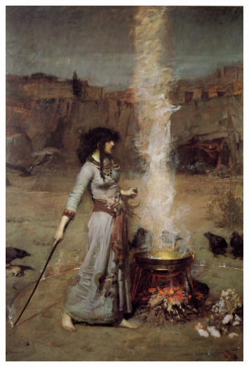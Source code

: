 \begin{figure}[H]
\centering
\includegraphics[width=0.80\textwidth]{graphics/frontmatter/j_m_waterhouse_magic_circle.pdf}
\end{figure}